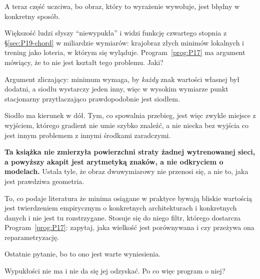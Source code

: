 \begin{fr}
A teraz część uczciwa, bo obraz, który to wyrażenie wywołuje, jest błędny w
konkretny sposób.

Większość ludzi słyszy \enquote{niewypukła} i widzi funkcję czwartego stopnia
z \S\ref{sec:P19-chord} w miliardzie wymiarów: krajobraz złych minimów
lokalnych i trening jako loteria, w którym się wyląduje.
Program~\ref{prog:P17} ma argument mówiący, że to nie jest kształt tego
problemu. Jaki?
\dotline
\nextframe
\end{fr}

\begin{fr}
\begin{ansblock}
Argument zliczający: minimum wymaga, by \emph{każdy} znak wartości własnej był
dodatni, a siodłu wystarczy jeden inny, więc w wysokim wymiarze punkt
stacjonarny przytłaczająco prawdopodobnie jest siodłem.
\end{ansblock}

Siodło ma kierunek w dół. Tym, co spowalnia przebieg, jest więc zwykle
miejsce z wyjściem, którego gradient nie umie szybko znaleźć, a nie niecka bez
wyjścia \dash{} co jest innym problemem z innymi środkami zaradczymi.

\begin{warning}
\textbf{Ta książka nie zmierzyła powierzchni straty żadnej wytrenowanej sieci,
a powyższy akapit jest arytmetyką znaków, a nie odkryciem o modelach.} Ustala
tyle, że obraz dwuwymiarowy nie przenosi się, a nie to, jaka jest prawdziwa
geometria.

To, co podaje literatura \dash{} że minima osiągane w praktyce bywają bliskie
wartością \dash{} jest twierdzeniem empirycznym o konkretnych architekturach i
konkretnych danych i nie jest tu rozstrzygane. Stosuje się do niego filtr,
którego dostarcza Program~\ref{prog:P17}: zapytaj, jaka wielkość jest
porównywana i czy przeżywa ona reparametryzację.
\end{warning}
\end{fr}

\begin{fr}
Ostatnie pytanie, bo to ono jest warte wyniesienia.

Wypukłości nie ma i nie da się jej odzyskać. Po co więc program o niej?
\nextframe
\end{fr}

